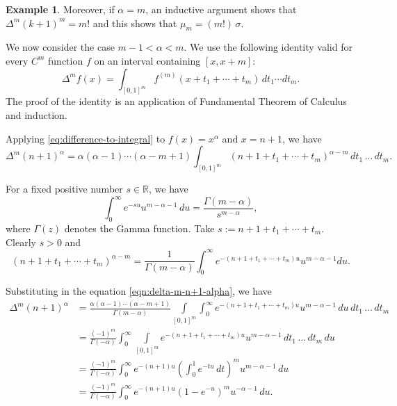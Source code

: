 \documentclass[10pt,oneside,reqno]{amsart}
\theoremstyle{definition}
\newtheorem{example}[theorem]{Example}
\theoremstyle{remark}
\newcommand{\R}{\mathbb R}
\numberwithin{equation}{section}
\begin{document}
\begin{example}
Moreover, if $\alpha =m$, an inductive argument shows that $\Delta ^{m} (k+1)^m = m!$ and this shows that $\mu_m = (m!)\, \sigma$.

We now consider the case $m-1 < \alpha < m$. We use the following identity valid for every $C^m$ function $f$ on an interval containing $[x,x+m]$:
\begin{equation} 
\Delta^m f(x) =\int_{[0,1]^m} f^{(m)}(x+t_1+\cdots+t_m) \, dt_1 \cdots dt_m.
\label{eq:difference-to-integral}
\end{equation}
The proof of the identity is an application of Fundamental Theorem of Calculus and induction.

Applying \eqref{eq:difference-to-integral} to $f(x)=x^\alpha$ and $x=n+1$, we have
\begin{equation}
    \Delta^m (n+1)^\alpha
=\alpha(\alpha-1)\cdots(\alpha-m+1)
\int_{[0,1]^m}(n+1+t_1+\cdots+t_m)^{\alpha-m}\,dt_1 \, \ldots \, dt_m.
\label{eqn:delta-m-n+1-alpha}
\end{equation}

For a fixed positive number $s\in \R$, we have
\begin{equation*}
    \int_{0}^{\infty} e^{-su} u^{m-\alpha-1} \, du = \frac{\Gamma(m-\alpha)}{s^{m-\alpha}},
\end{equation*} 
where $\Gamma (z)$ denotes the Gamma function. Take $s:=n+1+t_1+\cdots + t_m$. Clearly $s > 0$ and
\begin{equation*}
    \left( n + 1 + t_1 + \cdots + t_m \right)^{\alpha-m} = \frac{1}{\Gamma(m-\alpha)} \int_{0}^{\infty} e^{-(n+1+t_1 + \cdots + t_m) u} u^{m-\alpha-1} du.
\end{equation*}

Substituting in the equation \eqref{eqn:delta-m-n+1-alpha}, we have
\begin{align*}
    \Delta^m (n+1)^{\alpha} &= \frac{\alpha(\alpha-1)\cdots(\alpha-m+1)}{\Gamma(m-\alpha)} \int\limits_{[0,1]^m} \int_{0}^{\infty} e^{-(n+1+t_1 + \cdots + t_m) u} u^{m-\alpha-1} \,du\, dt_1\, \ldots\, dt_m \\
    &= \frac{(-1)^m}{\Gamma(-\alpha)} \int_{0}^{\infty} \int\limits_{[0,1]^m} e^{-(n+1+t_1 + \cdots + t_m) u} u^{m-\alpha-1} \, dt_1\, \ldots\, dt_m \,du \\
    &= \frac{(-1)^m}{\Gamma(-\alpha)} \int_{0}^{\infty} e^{-(n+1)u} \left( \int_{0}^{1} e^{-tu} \,dt\right)^{m} u^{m-\alpha-1} \, du \\
    &= \frac{(-1)^m}{\Gamma (-\alpha)} \int_{0}^{\infty} e^{-(n+1)u} (1-e^{-u})^{m} u^{-\alpha-1} \, du.
\end{align*}


\end{example}
\end{document}
